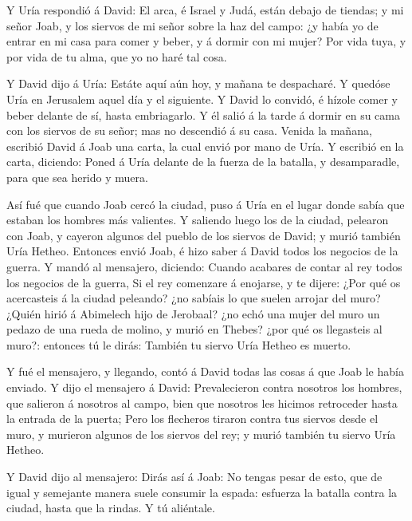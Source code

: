 Y Uría respondió á David: El arca, é Israel y Judá, están
debajo de tiendas; y mi señor Joab, y los siervos de mi señor sobre la
haz del campo: ¿y había yo de entrar en mi casa para comer y beber, y á
dormir con mi mujer? Por vida tuya, y por vida de tu alma, que yo no
haré tal cosa.

 Y David dijo á Uría: Estáte aquí aún hoy, y mañana te
despacharé. Y quedóse Uría en Jerusalem aquel día y el siguiente.
 Y David lo convidó, é hízole comer y beber delante de sí,
hasta embriagarlo. Y él salió á la tarde á dormir en su cama con los
siervos de su señor; mas no descendió á su casa.  Venida la
mañana, escribió David á Joab una carta, la cual envió por mano de Uría.
 Y escribió en la carta, diciendo: Poned á Uría delante de
la fuerza de la batalla, y desamparadle, para que sea herido y muera.

 Así fué que cuando Joab cercó la ciudad, puso á Uría en el
lugar donde sabía que estaban los hombres más valientes.  Y
saliendo luego los de la ciudad, pelearon con Joab, y cayeron algunos
del pueblo de los siervos de David; y murió también Uría Hetheo.
 Entonces envió Joab, é hizo saber á David todos los
negocios de la guerra.  Y mandó al mensajero, diciendo:
Cuando acabares de contar al rey todos los negocios de la guerra,
 Si el rey comenzare á enojarse, y te dijere: ¿Por qué os
acercasteis á la ciudad peleando? ¿no sabíais lo que suelen arrojar del
muro?  ¿Quién hirió á Abimelech hijo de Jerobaal? ¿no echó
una mujer del muro un pedazo de una rueda de molino, y murió en Thebes?
¿por qué os llegasteis al muro?: entonces tú le dirás: También tu siervo
Uría Hetheo es muerto.

 Y fué el mensajero, y llegando, contó á David todas las
cosas á que Joab le había enviado.  Y dijo el mensajero á
David: Prevalecieron contra nosotros los hombres, que salieron á
nosotros al campo, bien que nosotros les hicimos retroceder hasta la
entrada de la puerta;  Pero los flecheros tiraron contra
tus siervos desde el muro, y murieron algunos de los siervos del rey; y
murió también tu siervo Uría Hetheo.

 Y David dijo al mensajero: Dirás así á Joab: No tengas
pesar de esto, que de igual y semejante manera suele consumir la espada:
esfuerza la batalla contra la ciudad, hasta que la rindas. Y tú
aliéntale.

